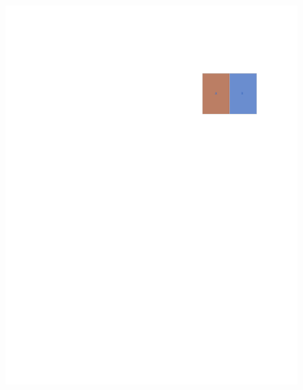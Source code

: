 \begin{minipage}[b]{0.3\linewidth}
    \begin{figure}[H]
        \centering
        \includegraphics[scale=0.8]{figures/ven2.pdf}
        \caption{}
        \label{figures/ven2.pdf}
    \end{figure}
\end{minipage}\hfill
